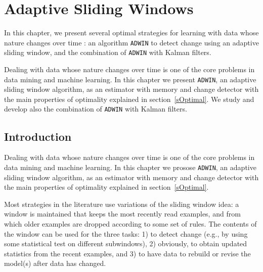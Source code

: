 \chapter{Adaptive Sliding Windows}
\label{ch:adwin}

\BEGINOMIT
In this chapter, we present %
several optimal strategies 
for learning with data whose nature changes over time
 : an algorithm {\tt ADWIN} to detect change using an adaptive sliding window, and the combination of {\tt ADWIN} with Kalman filters.
\ENDOMIT

Dealing with data whose nature changes over time
is one of the core problems in data mining and machine learning.
In this chapter we present {\tt ADWIN}, an adaptive sliding window
algorithm, as an estimator with memory and change detector with the
main properties of optimality explained in section~\ref{sOptimal}. 
We study and develop also the combination of {\tt ADWIN} with Kalman filters.


\section{Introduction}
\label{Introduction}

\BEGINOMIT
Dealing with data whose nature changes over time
is one of the core problems in data mining and machine learning.
In this chapter we prosose {\tt ADWIN}, an adaptive sliding window
algorithm, as an estimator with memory and change detector with the
main properties of optimality explained in section~\ref{sOptimal}. 
\ENDOMIT

Most strategies in the literature use variations of the {sliding window} idea:
a window is maintained that keeps the most recently read examples,
and from which older examples are dropped according to some
set of rules. The contents of the window can be used for the
three tasks: 1) to detect change (e.g., by using some statistical
test on different subwindows), 2) obviously, to
obtain updated statistics from the recent examples,
and 3) to have data to rebuild or revise the model(s) after data has 
changed.

